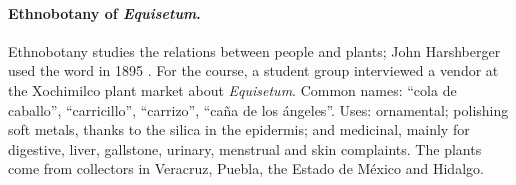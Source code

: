 \paragraph{Ethnobotany of \emph{Equisetum}.}
Ethnobotany studies the relations between
people and plants; John Harshberger used the
word in 1895 \cite[Chapter
1]{young2007ethnobotany}. For the course,
a student group interviewed a vendor at the
Xochimilco plant market about
\emph{Equisetum}. Common names: ``cola de
caballo'', ``carricillo'', ``carrizo'',
``ca\~na de los \'angeles''. Uses:
ornamental; polishing soft metals, thanks
to the silica in the epidermis; and
medicinal, mainly for digestive, liver,
gallstone, urinary, menstrual and skin
complaints. The plants come from collectors
in Veracruz, Puebla, the Estado de M\'exico
and Hidalgo.





